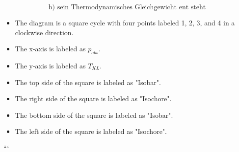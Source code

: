 \[
\text{b) sein Thermodynamisches Gleichgewicht ent steht}
\]


\begin{itemize}
    \item The diagram is a square cycle with four points labeled 1, 2, 3, and 4 in a clockwise direction.
    \item The x-axis is labeled as $p_{abs}$.
    \item The y-axis is labeled as $T_{KL}$.
    \item The top side of the square is labeled as "Isobar".
    \item The right side of the square is labeled as "Isochore".
    \item The bottom side of the square is labeled as "Isobar".
    \item The left side of the square is labeled as "Isochore".
\end{itemize}

```